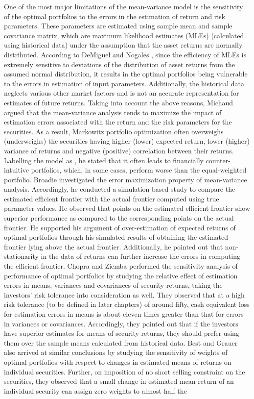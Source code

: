 One of the most major limitations of the mean-variance model is the sensitivity of the optimal portfolios to the errors in the estimation of return and risk parameters. These parameters are estimated using sample mean and sample covariance matrix, which are maximum likelihood estimates (MLEs) (calculated using historical data) under the assumption that the asset returns are normally distributed. According to DeMiguel and Nogales \cite{demiguel}, since the efficiency of MLEs is extremely sensitive to deviations of the distribution of asset returns from the assumed normal distribution, it results in the optimal portfolios being vulnerable to the errors in estimation of input parameters. Additionally, the historical data neglects various other market factors and is not an accurate representation for estimates of future returns. Taking into account the above reasons, Michaud \cite{Michaud} argued that the mean-variance analysis tends to maximize the impact of estimation errors associated with the return and the risk parameters for the securities. As a result, Markowitz portfolio optimization often overweighs (underweighs) the securities having higher (lower) expected return, lower (higher) variance of returns and negative (positive) correlation between their returns. Labelling the model as , he stated that it often leads to financially counter-intuitive portfolios, which, in some cases, perform worse than the equal-weighted portfolio. Broadie \cite{Broadie} investigated the error maximization property of mean-variance analysis. Accordingly, he conducted a simulation based study to compare the estimated efficient frontier with the actual frontier computed using true parameter values. He observed that points on the estimated efficient frontier show superior performance as compared to the corresponding points on the actual frontier. He supported his argument of over-estimation of expected returns of optimal portfolios through his simulated results of obtaining the estimated frontier lying above the actual frontier. Additionally, he pointed out that non-stationarity in the data of returns can further increase the errors in computing the efficient frontier. Chopra and Ziemba \cite{Chopra} performed the sensitivity analysis of performance of optimal portfolios by studying the relative effect of estimation errors in means, variances and covariances of security returns, taking the investors' risk tolerance into consideration as well. They observed that at a high risk tolerance (to be defined in later chapters) of around fifty, cash equivalent loss for estimation errors in means is about eleven times greater than that for errors in variances or covariances. Accordingly, they pointed out that if the investors have superior estimates for means of security returns, they should prefer using them over the sample means calculated from historical data. Best and Grauer \cite{Best1,Best2} also arrived at similar conclusions by studying the sensitivity of weights of optimal portfolios with respect to changes in estimated means of returns on individual securities. Further, on imposition of no short selling constraint on the securities, they observed that a small change in estimated mean return of an individual security can assign zero weights to almost half the 